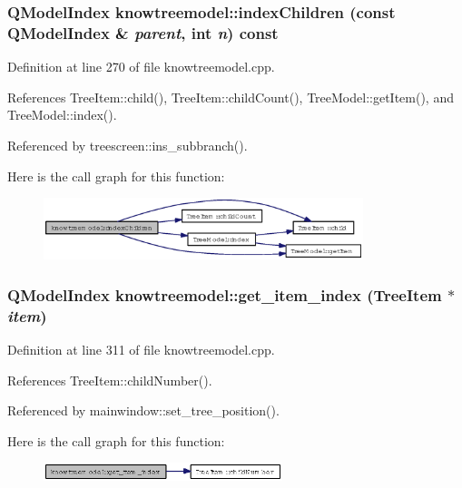 \subsubsection{\setlength{\rightskip}{0pt plus 5cm}QModel\-Index knowtreemodel::index\-Children (const QModel\-Index \& {\em parent}, int {\em n}) const}\label{classknowtreemodel_7802e8122c237aabd9050ed36295999f}




Definition at line 270 of file knowtreemodel.cpp.

References Tree\-Item::child(), Tree\-Item::child\-Count(), Tree\-Model::get\-Item(), and Tree\-Model::index().

Referenced by treescreen::ins\_\-subbranch().

Here is the call graph for this function:\begin{figure}[H]
\begin{center}
\leavevmode
\includegraphics[width=264pt]{classknowtreemodel_7802e8122c237aabd9050ed36295999f_cgraph}
\end{center}
\end{figure}
\subsubsection{\setlength{\rightskip}{0pt plus 5cm}QModel\-Index knowtreemodel::get\_\-item\_\-index ({\bf Tree\-Item} $\ast$ {\em item})}\label{classknowtreemodel_6e9e460ebb16f09d1015fcc69ea943e9}




Definition at line 311 of file knowtreemodel.cpp.

References Tree\-Item::child\-Number().

Referenced by mainwindow::set\_\-tree\_\-position().

Here is the call graph for this function:\begin{figure}[H]
\begin{center}
\leavevmode
\includegraphics[width=197pt]{classknowtreemodel_6e9e460ebb16f09d1015fcc69ea943e9_cgraph}
\end{center}
\end{figure}


